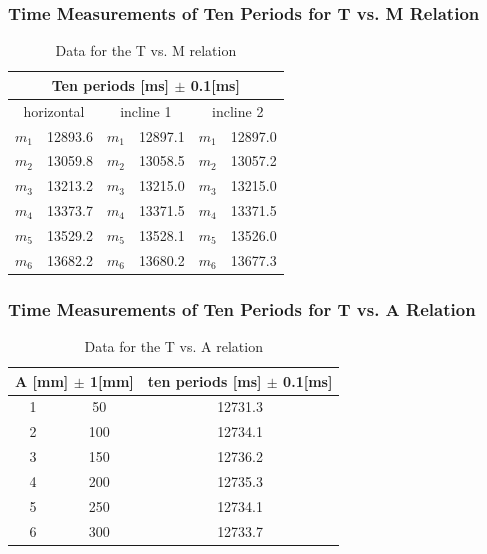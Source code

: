 \documentclass[12pt]{article}
\begin{document}
\subsubsection{Time Measurements of Ten Periods for T vs. M Relation}
\begin{table}[H]
\centering
\begin{tabular}{|c|c|c|c|c|c|}
\hline
\multicolumn{6}{|c|}{Ten periods {[}ms{]} $\pm$ 0.1{[}ms{]}}                                           \\ \hline
\multicolumn{2}{|c|}{horizontal} & \multicolumn{2}{c|}{incline 1} & \multicolumn{2}{c|}{incline 2} \\ \hline
$m_1$            & 12893.6           &  $m_1$          & 12897.1           &           $m_1$ & 12897.0           \\ \hline
$m_2$             & 13059.8           &  $m_2$              & 13058.5           &           $m_2$     & 13057.2           \\ \hline
$m_3$                 & 13213.2           &    $m_3$         & 13215.0           &           $m_3$  & 13215.0           \\ \hline
$m_4$              & 13373.7           &   $m_4$         & 13371.5           &            $m_4$& 13371.5           \\ \hline
$m_5$             & 13529.2           &   $m_5$         & 13528.1           &           $m_5$ & 13526.0           \\ \hline
$m_6$         & 13682.2           &    $m_6$        & 13680.2           &     $m_6$       & 13677.3           \\ \hline
\end{tabular}
\caption{Data for the T vs. M relation}
\end{table}
\subsubsection{Time Measurements of Ten Periods for T vs. A Relation}
\begin{table}[H]
\centering
\begin{tabular}{|c|c|c|}
\hline
\multicolumn{2}{|c|}{A {[}mm{]} $\pm$ 1{[}mm{]}} & ten periods {[}ms{]} $\pm$ 0.1{[}ms{]} \\ \hline
1                   & 50                   & 12731.3                          \\ \hline
2                   & 100                  & 12734.1                          \\ \hline
3                   & 150                  & 12736.2                          \\ \hline
4                   & 200                  & 12735.3                          \\ \hline
5                   & 250                  & 12734.1                          \\ \hline
6                   & 300                  & 12733.7                          \\ \hline
\end{tabular}
\caption{Data for the T vs. A relation}
\end{table}
\end{document}
